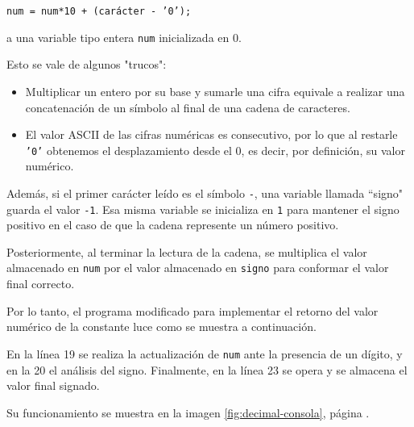 \documentclass[a4paper, 12pt]{article}
\begin{document}
\begin{center}
    \texttt{num = num*10 + (carácter - '0');}
\end{center}

a una variable tipo entera \texttt{num} inicializada en 0.

Esto se vale de algunos "trucos":
\begin{itemize}
    \item Multiplicar un entero por su base y sumarle una cifra equivale a realizar una concatenación de un símbolo al final de una cadena de caracteres.
    \item El valor ASCII de las cifras numéricas es consecutivo, por lo que al restarle \texttt{'0'} obtenemos el desplazamiento desde el 0, es decir, por definición, su valor numérico.
\end{itemize}

Además, si el primer carácter leído es el símbolo \texttt{-}, una variable llamada ``signo" guarda el valor \texttt{-1}. Esa misma variable se inicializa en \texttt{1} para mantener el signo positivo en el caso de que la cadena represente un número positivo.

Posteriormente, al terminar la lectura de la cadena, se multiplica el valor almacenado en \texttt{num} por el valor almacenado en \texttt{signo} para conformar el valor final correcto.

Por lo tanto, el programa modificado para implementar el retorno del valor numérico de la constante luce como se muestra a continuación.

\newpage



En la línea 19 se realiza la actualización de \texttt{num} ante la presencia de un dígito, y en la 20 el análisis del signo. Finalmente, en la línea 23 se opera y se almacena el valor final signado.

Su funcionamiento se muestra en la imagen \ref{fig:decimal-consola}, página \pageref{fig:decimal-consola}.
\end{document}
